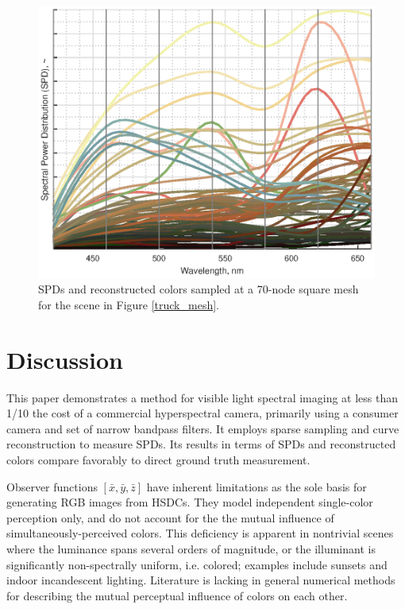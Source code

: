 \documentclass[twocolumn,10pt]{asme2ej}
\newcommand{\id}{\hspace{6 mm}}
\begin{document}
\begin{figure}[H]
\begin{centering}
  \includegraphics[height=0.6\linewidth]{truck_SPDs.eps}
  \caption{SPDs and reconstructed colors sampled at a 70-node square mesh for the scene in Figure \ref{truck_mesh}.}
  \label{path_SPDs}
  \end{centering}
\end{figure}


\clearpage
\twocolumn

\section{Discussion}

This paper demonstrates a method for visible light spectral imaging at less than 1/10 the cost of a commercial hyperspectral camera, primarily using a consumer camera and set of narrow bandpass filters. It employs sparse sampling and curve reconstruction to measure SPDs. Its results in terms of SPDs and reconstructed colors compare favorably to direct ground truth measurement.

\id Observer functions $[ \bar{x}, \bar{y}, \bar{z} ]$ have inherent limitations as the sole basis for generating RGB images from HSDCs. They model independent single-color perception only, and do not account for the the mutual influence of simultaneously-perceived colors. This deficiency is apparent in nontrivial scenes where the luminance spans several orders of magnitude, or the illuminant is significantly non-spectrally uniform, i.e. colored; examples include sunsets and indoor incandescent lighting. Literature is lacking in general numerical methods for describing the mutual perceptual influence of colors on each other.
\end{document}
